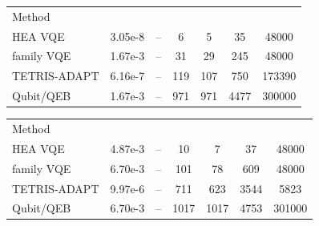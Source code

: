 \documentclass[
  reprint,
  amsmath,
  amssymb,
  aps,
  pra,
  nofootinbib,
  superscriptaddress,
  floatfix
]{revtex4-2}
\newcommand{\metrichead}[1]{\makebox[0.061\textwidth][c]{#1}}
\begin{document}
\noindent\begin{minipage}{\columnwidth}
\begin{center}
\scriptsize
\setlength{\tabcolsep}{1.1pt}
\renewcommand{\arraystretch}{1.02}
\begin{ruledtabular}
\begin{tabular}{p{}cccccc}
Method & \metrichead{$|\Delta E|$} & \metrichead{$1-F$} & \metrichead{$N_{2q}$} & \metrichead{$D_{2q}$} & \metrichead{$D_c$} & \metrichead{$S$}\\
\colrule
HEA VQE & 3.05e-8 & -- & 6 & 5 & 35 & 48000\\
family VQE & 1.67e-3 & -- & 31 & 29 & 245 & 48000\\
TETRIS-ADAPT & 6.16e-7 & -- & 119 & 107 & 750 & 173390\\
Qubit/QEB & 1.67e-3 & -- & 971 & 971 & 4477 & 300000\\
\end{tabular}
\end{ruledtabular}
\end{center}
\end{minipage}
\par\addvspace{1.0ex}

\noindent\begin{minipage}{\columnwidth}
\begin{center}
\scriptsize
\setlength{\tabcolsep}{1.1pt}
\renewcommand{\arraystretch}{1.02}
\begin{ruledtabular}
\begin{tabular}{p{}cccccc}
Method & \metrichead{$|\Delta E|$} & \metrichead{$1-F$} & \metrichead{$N_{2q}$} & \metrichead{$D_{2q}$} & \metrichead{$D_c$} & \metrichead{$S$}\\
\colrule
HEA VQE & 4.87e-3 & -- & 10 & 7 & 37 & 48000\\
family VQE & 6.70e-3 & -- & 101 & 78 & 609 & 48000\\
TETRIS-ADAPT & 9.97e-6 & -- & 711 & 623 & 3544 & 5823\\
Qubit/QEB & 6.70e-3 & -- & 1017 & 1017 & 4753 & 301000\\
\end{tabular}
\end{ruledtabular}
\end{center}
\end{minipage}
\par\addvspace{1.0ex}
\end{document}

